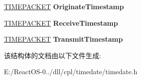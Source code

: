 \begin{DoxyCompactItemize}
\hyperlink{struct___t_i_m_e_p_a_c_k_e_t}{T\+I\+M\+E\+P\+A\+C\+K\+ET} {\bfseries Originate\+Timestamp}
\item 
\mbox{\label{struct___n_t_p_p_a_c_k_e_t_a57e68e26b4c77b655ccd9e676a7d60f4}} 
\hyperlink{struct___t_i_m_e_p_a_c_k_e_t}{T\+I\+M\+E\+P\+A\+C\+K\+ET} {\bfseries Receive\+Timestamp}
\item 
\mbox{\label{struct___n_t_p_p_a_c_k_e_t_a0318d1811f0dfb581c57fb46a8951b30}} 
\hyperlink{struct___t_i_m_e_p_a_c_k_e_t}{T\+I\+M\+E\+P\+A\+C\+K\+ET} {\bfseries Transmit\+Timestamp}
\end{DoxyCompactItemize}


该结构体的文档由以下文件生成\+:\begin{DoxyCompactItemize}
\item 
E\+:/\+React\+O\+S-\/0../dll/cpl/timedate/timedate.\+h\end{DoxyCompactItemize}
